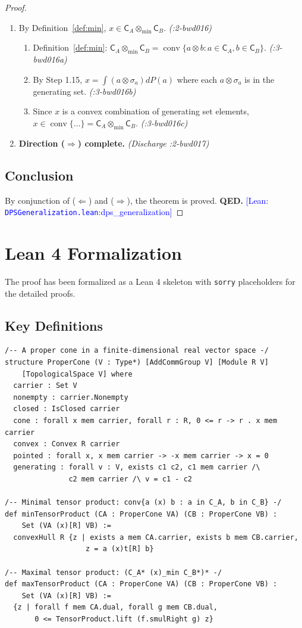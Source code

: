 \documentclass[11pt,a4paper]{article}
\theoremstyle{definition}
\theoremstyle{plain}
\newcommand{\proofstep}[2]{\item[$\langle #1 \rangle$#2.]}
\newcommand{\leanref}[2]{\textcolor{blue}{\small [Lean: \texttt{#1}:#2]}}
\DeclareMathOperator{\conv}{conv}
\newcommand{\tmin}{{\otimes_{\min}}}
\newcommand{\C}{\mathsf{C}}
\begin{document}
\begin{proof}
\begin{enumerate}[leftmargin=2em]
\proofstep{1}{16} By Definition~\ref{def:min}, $x \in \C_A \tmin \C_B$. \textit{(:2-bwd016)}
\begin{enumerate}[leftmargin=1.5em, label=$\langle 2.\alph* \rangle$]
\item Definition~\ref{def:min}: $\C_A \tmin \C_B = \conv\{a \otimes b : a \in \C_A, b \in \C_B\}$. \textit{(:3-bwd016a)}
\item By Step 1.15, $x = \int (a \otimes \sigma_a) dP(a)$ where each $a \otimes \sigma_a$ is in the generating set. \textit{(:3-bwd016b)}
\item Since $x$ is a convex combination of generating set elements, $x \in \conv\{...\} = \C_A \tmin \C_B$. \textit{(:3-bwd016c)}
\end{enumerate}

\proofstep{1}{17} \textbf{Direction ($\Rightarrow$) complete.} \textit{(Discharge :2-bwd017)}
\end{enumerate}

\subsection*{Conclusion}

By conjunction of ($\Leftarrow$) and ($\Rightarrow$), the theorem is proved. \textbf{QED.}
\leanref{DPSGeneralization.lean}{dps\_generalization}
\end{proof}

\section{Lean 4 Formalization}

The proof has been formalized as a Lean 4 skeleton with \texttt{sorry} placeholders for the detailed proofs.

\subsection{Key Definitions}

\begin{lstlisting}[firstnumber=20]
/-- A proper cone in a finite-dimensional real vector space -/
structure ProperCone (V : Type*) [AddCommGroup V] [Module R V]
    [TopologicalSpace V] where
  carrier : Set V
  nonempty : carrier.Nonempty
  closed : IsClosed carrier
  cone : forall x mem carrier, forall r : R, 0 <= r -> r . x mem carrier
  convex : Convex R carrier
  pointed : forall x, x mem carrier -> -x mem carrier -> x = 0
  generating : forall v : V, exists c1 c2, c1 mem carrier /\
               c2 mem carrier /\ v = c1 - c2

/-- Minimal tensor product: conv{a (x) b : a in C_A, b in C_B} -/
def minTensorProduct (CA : ProperCone VA) (CB : ProperCone VB) :
    Set (VA (x)[R] VB) :=
  convexHull R {z | exists a mem CA.carrier, exists b mem CB.carrier,
                   z = a (x)t[R] b}

/-- Maximal tensor product: (C_A* (x)_min C_B*)* -/
def maxTensorProduct (CA : ProperCone VA) (CB : ProperCone VB) :
    Set (VA (x)[R] VB) :=
  {z | forall f mem CA.dual, forall g mem CB.dual,
       0 <= TensorProduct.lift (f.smulRight g) z}
\end{lstlisting}
\end{document}
